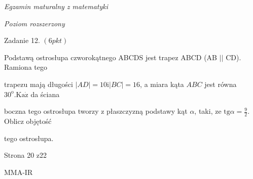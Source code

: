 \documentclass[a4paper,12pt]{article}
\begin{document}
{\it Egzamin maturalny z matematyki}

{\it Poziom rozszerzony}

Zadanie 12. $(6pkt)$

Podstawą ostrosłupa czworokątnego ABCDS jest trapez ABCD (AB $||$ CD). Ramiona tego

trapezu mają długości $|AD|=10 \mathrm{i}|BC|=16$, a miara kąta $ABC$ jest równa $30^{\mathrm{o}}. \mathrm{K}\mathrm{a}\dot{\mathrm{z}}$ da ściana

boczna tego ostrosłupa tworzy z płaszczyzną podstawy kąt $\alpha$, taki, ze $\displaystyle \mathrm{t}\mathrm{g}\alpha=\frac{9}{2}$. Oblicz objętość

tego ostrosłupa.

Strona 20 z22

MMA-IR
\end{document}
